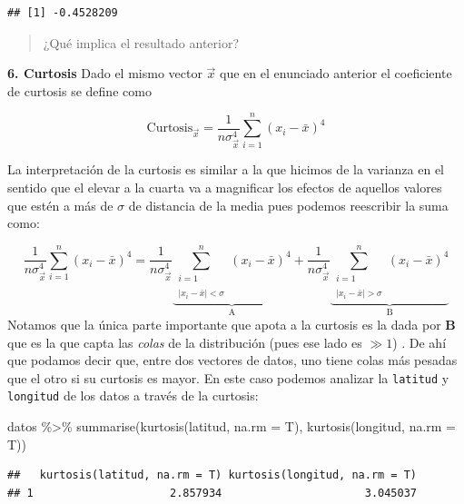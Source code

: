 \documentclass[
]{book}
\newenvironment{Shaded}{\begin{snugshade}}{\end{snugshade}}
\newcommand{\AttributeTok}[1]{\textcolor[rgb]{0.77,0.63,0.00}{#1}}
\newcommand{\FunctionTok}[1]{\textcolor[rgb]{0.00,0.00,0.00}{#1}}
\newcommand{\NormalTok}[1]{#1}
\newcommand{\SpecialCharTok}[1]{\textcolor[rgb]{0.00,0.00,0.00}{#1}}
\begin{document}
\begin{verbatim}
## [1] -0.4528209
\end{verbatim}

\begin{quote}
¿Qué implica el resultado anterior?
\end{quote}

\textbf{6. Curtosis} Dado el mismo vector \(\vec{x}\) que en el enunciado anterior el coeficiente de curtosis se define como

\[
\text{Curtosis}_{\vec{x}} = \frac{1}{n \sigma^4_{\vec{x}} } \sum\limits_{i = 1}^{n} (x_i - \bar{x})^4
\]

La interpretación de la curtosis es similar a la que hicimos de la varianza en el sentido que el elevar a la cuarta va a magnificar los efectos de aquellos valores que estén a más de \(\sigma\) de distancia de la media pues podemos reescribir la suma como:

\[
\frac{1}{n \sigma^4_{\vec{x}} } \sum\limits_{i = 1}^{n} (x_i - \bar{x})^4  = \frac{1}{n \sigma^4_{\vec{x}} }  \underbrace{\sum\limits_{\substack{i = 1 \\ \\ | x_i - \bar{x}| < \sigma}}^{n} (x_i - \bar{x})^4}_{\text{A}} + \frac{1}{n \sigma^4_{\vec{x}} }  \underbrace{\sum\limits_{\substack{i = 1 \\ \\ | x_i - \bar{x}| > \sigma}}^{n} (x_i - \bar{x})^4}_{\text{B}} 
\]
Notamos que la única parte importante que apota a la curtosis es la dada por \textbf{B} que es la que capta las \emph{colas} de la distribución (pues ese lado es \(\gg 1\)) . De ahí que podamos decir que, entre dos vectores de datos, uno tiene colas más pesadas que el otro si su curtosis es mayor. En este caso podemos analizar la \texttt{latitud} y \texttt{longitud} de los datos a través de la curtosis:

\begin{Shaded}
\begin{Highlighting}[]
\NormalTok{datos }\SpecialCharTok{\%\textgreater{}\%} \FunctionTok{summarise}\NormalTok{(}\FunctionTok{kurtosis}\NormalTok{(latitud, }\AttributeTok{na.rm =}\NormalTok{ T), }\FunctionTok{kurtosis}\NormalTok{(longitud, }\AttributeTok{na.rm =}\NormalTok{ T))}
\end{Highlighting}
\end{Shaded}

\begin{verbatim}
##   kurtosis(latitud, na.rm = T) kurtosis(longitud, na.rm = T)
## 1                     2.857934                      3.045037
\end{verbatim}
\end{document}
